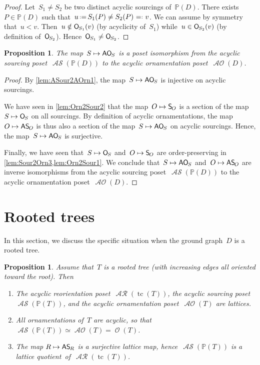 \documentclass{amsart}
\newtheorem{proposition}[theorem]{Proposition}
\theoremstyle{definition}
\renewcommand{\c}[1]{\mathcal{#1}} %
\newcommand{\eqdef}{\mbox{\,\raisebox{0.2ex}{\scriptsize\ensuremath{\mathrm:}}\ensuremath{=}\,}} %
\newcommand{\defeq}{\mbox{~\ensuremath{=}\raisebox{0.2ex}{\scriptsize\ensuremath{\mathrm:}} }} %
\DeclareMathOperator{\tc}{tc} %
\newcommand{\mymap}[2]{\mathsf{#1}_{\hspace{-.7pt}#2}}
\DeclareMathOperator{\Orn}{\c{O}}  %
\newcommand{\orn}[1]{\mymap{O}{#1}}  %
\DeclareMathOperator{\AOrn}{\c{AO}}  %
\newcommand{\aorn}[1]{\mymap{AO}{#1}}  %
\DeclareMathOperator{\AReori}{\c{AR}}  %
\newcommand{\sour}[1]{\mymap{S}{#1}}  %
\DeclareMathOperator{\ASour}{\mathcal{AS}}  %
\newcommand{\asour}[1]{\mymap{AS}{#1}}  %
\newcommand{\PP}{\mathbb P} %
\begin{document}
\begin{proof}
Let~$S_1 \ne S_2$ be two distinct acyclic sourcings of~$\PP(D)$.
There exists~$P \in \PP(D)$ such that~$u \eqdef S_1(P) \ne S_2(P) \defeq v$.
We can assume by symmetry that~$u < v$.
Then~$u \notin \orn{S_1}(v)$ (by acyclicity of~$S_1$) while~$u \in \orn{S_2}(v)$ (by definition of~$\orn{S_2}$).
Hence~$\orn{S_1} \ne \orn{S_2}$.
\end{proof}

\begin{proposition}
\label{prop:ASour2AOrn}
The map~$S \mapsto \aorn{S}$ is a poset isomorphism from the acyclic sourcing poset~$\ASour(\PP(D))$ to the acyclic ornamentation poset~$\AOrn(D)$.
\end{proposition}

\begin{proof}
By \cref{lem:ASour2AOrn1}, the map~$S \mapsto \aorn{S}$ is injective on acyclic sourcings.

We have seen in \cref{lem:Orn2Sour2} that the map~$O \mapsto \sour{O}$ is a section of the map~$S \mapsto \orn{S}$ on all sourcings.
By definition of acyclic ornamentations, the map~$O \mapsto \asour{O}$ is thus also a section of the map~$S \mapsto \aorn{S}$ on acyclic sourcings.
Hence, the map~$S \mapsto \aorn{S}$ is surjective.

Finally, we have seen that~$S \mapsto \orn{S}$ and~$O \mapsto \sour{O}$ are order-preserving in \cref{lem:Sour2Orn3,lem:Orn2Sour1}.
We conclude that~$S \mapsto \aorn{S}$ and~$O \mapsto \asour{O}$ are inverse isomorphisms from the acyclic sourcing poset~$\ASour(\PP(D))$ to the acyclic ornamentation poset~$\AOrn(D)$.
\end{proof}


\section{Rooted trees}
\label{sec:rootedTrees}

In this section, we discuss the specific situation when the ground graph~$D$ is a rooted tree.

\begin{proposition}
\label{prop:rootedTrees}
Assume that~$T$ is a rooted tree (with increasing edges all oriented toward the root). Then
\begin{enumerate}
\item The acyclic reorientation poset~$\AReori(\tc(T))$, the acyclic sourcing poset~$\ASour(\PP(T))$, and the acyclic ornamentation poset~$\AOrn(T)$ are lattices.
\item All ornamentations of~$T$ are acyclic, so that~$\ASour(\PP(T)) \simeq \AOrn(T) = \Orn(T)$.
\item The map $R \mapsto \asour{R}$ is a surjective lattice map, hence~$\ASour(\PP(T))$ is a lattice quotient~of~$\AReori(\tc(T))$.
\end{enumerate}
\end{proposition}
\end{document}
